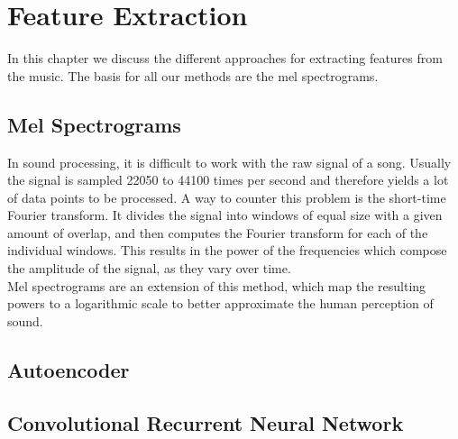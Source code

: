 \chapter{Feature Extraction}
    In this chapter we discuss the different approaches for extracting features from the music. The basis for all our methods are the mel spectrograms.

\section{Mel Spectrograms}
    In sound processing, it is difficult to work with the raw signal of a song.
    Usually the signal is sampled 22050 to 44100 times per second and therefore yields a lot of data points to be processed.
    A way to counter this problem is the short-time Fourier transform. 
    It divides the signal into windows of equal size with a given amount of overlap, and then computes the Fourier transform for each of the individual windows.
    This results in the power of the frequencies which compose the amplitude of the signal, as they vary over time.\\
    Mel spectrograms are an extension of this method, which map the resulting powers to a logarithmic scale to better approximate the human perception of sound.

\section{Autoencoder}

\section{Convolutional Recurrent Neural Network}